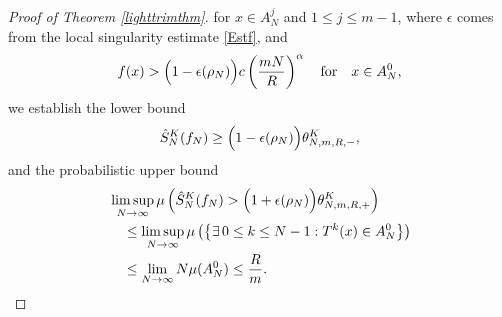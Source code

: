 \documentclass[11pt,twoside,a4paper,reqno]{amsart}
\begin{document}
\begin{proof}[Proof of Theorem \ref{lighttrimthm}]
for $x\in A_{N}^{j}$ and $1\leq j\leq m-1$, where $\epsilon$ comes from the local singularity estimate \eqref{Estf}, and
$$f(x)>\Bigl(1-\epsilon(\rho_N)\Bigr)c\left(\frac{mN}{R}\right)^\alpha\quad\text{for}\quad x\in A_{N}^{0},$$
we establish the lower bound
\begin{equation}\label{SNfNlob}
\hat{S}_N^K(f_N) \geq \Bigl(1-\epsilon(\rho_N)\Bigr) \theta_{N,m,R,-}^K,
\end{equation}
and the probabilistic upper bound
\begin{equation}\label{SNfNupb}
\begin{aligned}
&\limsup_{N\rightarrow\infty}\mu\left(\hat{S}_N^K(f_N) >\Bigl(1+\epsilon(\rho_N)\Bigr)\theta_{N,m,R,+}^K\right)\\
&\quad\leq\limsup_{N\rightarrow\infty}\mu\left(\left\{
\exists\,0\le k\le N-1: T^k(x) \in A_N^0\right\}\right)\\
& \quad\leq \lim_{N\rightarrow\infty} N \mu(A_N^0)\leq \frac{R}{m}.
\end{aligned}
\end{equation}






\end{proof}
\end{document}

